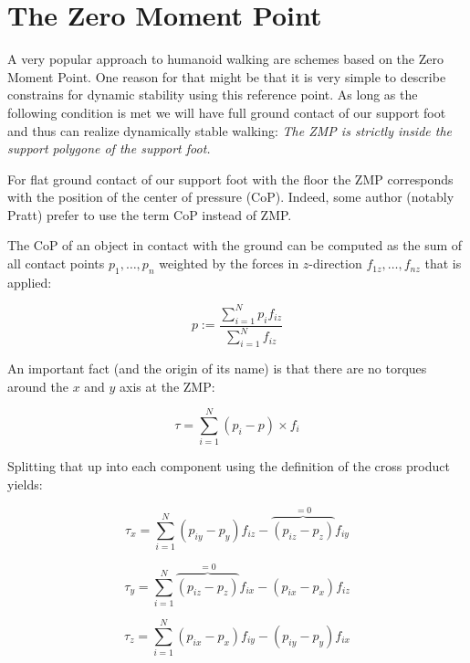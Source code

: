\documentclass[english,ngerman]{KITreprt}
\begin{document}
\section{The Zero Moment Point}\label{the-zero-moment-point}

A very popular approach to humanoid walking are schemes based on the
Zero Moment Point. One reason for that might be that it is very simple
to describe constrains for dynamic stability using this reference point.
As long as the following condition is met we will have full ground
contact of our support foot and thus can realize dynamically stable
walking: \emph{The ZMP is strictly inside the support polygone of the
support foot.}

For flat ground contact of our support foot with the floor the ZMP
corresponds with the position of the center of pressure (CoP). Indeed,
some author (notably Pratt) prefer to use the term CoP instead of ZMP.

The CoP of an object in contact with the ground can be computed as the
sum of all contact points $p_1, \dots, p_n$ weighted by the forces in
$z$-direction $f_{1z}, \dots, f_{nz}$ that is applied:

\begin{equation} \label{eq:zmp-definition}
p := \frac{\sum^N_{i=1}p_i f_{iz}}{\sum^N_{i=1} f_{iz}}
\end{equation}

An important fact (and the origin of its name) is that there are no
torques around the $x$ and $y$ axis at the ZMP:

\begin{equation}
\tau = \sum^N_{i=1} (p_i - p) \times f_i
\end{equation}

Splitting that up into each component using the definition of the cross
product yields:

\begin{equation}
\tau_x = \sum^N_{i=1} (p_{iy} - p_y) f_{iz} - \overbrace{(p_{iz} - p_z)}^{=0} f_{iy}
\end{equation}

\begin{equation}
\tau_y = \sum^N_{i=1} \overbrace{(p_{iz} - p_z)}^{=0} f_{ix} - (p_{ix} - p_x) f_{iz}
\end{equation}

\begin{equation}
\tau_z = \sum^N_{i=1} (p_{ix} - p_x) f_{iy} - (p_{iy} - p_y) f_{ix}
\end{equation}
\end{document}
